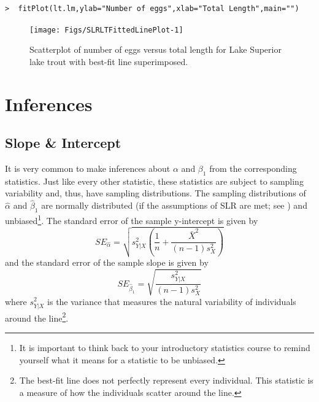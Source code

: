 \documentclass[10pt,openany]{book}\usepackage[]{graphicx}\usepackage[]{color}
\makeatletter
\newenvironment{kframe}{%
 \def\at@end@of@kframe{}%
 \ifinner\ifhmode%
  \def\at@end@of@kframe{\end{minipage}}%
  \begin{minipage}{\columnwidth}%
 \fi\fi%
 \def\FrameCommand##1{\hskip\@totalleftmargin \hskip-\fboxsep
 \colorbox{shadecolor}{##1}\hskip-\fboxsep
     \hskip-\linewidth \hskip-\@totalleftmargin \hskip\columnwidth}%
 \MakeFramed {\advance\hsize-\width
   \@totalleftmargin\z@ \linewidth\hsize
   \@setminipage}}%
 {\par\unskip\endMakeFramed%
 \at@end@of@kframe}
\newenvironment{knitrout}{}{} %
\makeatother
\begin{document}
\begin{knitrout}
\color{fgcolor}\begin{kframe}
\begin{verbatim}
>  fitPlot(lt.lm,ylab="Number of eggs",xlab="Total Length",main="")
\end{verbatim}
\end{kframe}\begin{figure}[h]

{\centering \texttt{[image: Figs/SLRLTFittedLinePlot-1]} 

}

\caption[Scatterplot of number of eggs versus total length for Lake Superior lake trout with best-fit line superimposed]{Scatterplot of number of eggs versus total length for Lake Superior lake trout with best-fit line superimposed.}\label{fig:SLRLTFittedLinePlot}
\end{figure}


\end{knitrout}


\section{Inferences} \label{sect:SLRInferences}
\subsection{Slope \& Intercept}
It is very common to make inferences about $\alpha$ and $\beta_{1}$ from the corresponding statistics.  Just like every other statistic, these statistics are subject to sampling variability and, thus, have sampling distributions.  The sampling distributions of $\hat{\alpha}$ and $\hat{\beta}_{1}$ are normally distributed (if the assumptions of SLR are met; see ) and unbiased\footnote{It is important to think back to your introductory statistics course to remind yourself what it means for a statistic to be unbiased.}.  The standard error of the sample y-intercept is given by
\[ SE_{\hat{\alpha}} = \sqrt{s^{2}_{Y|X}\left(\frac{1}{n}+\frac{\bar{X}^{2}}{(n-1)s_{X}^{2}}\right)} \]
and the standard error of the sample slope is given by
\[ SE_{\hat{\beta}_{1}} = \sqrt{\frac{s^{2}_{Y|X}}{(n-1)s_{X}^{2}}}  \]
where $s^{2}_{Y|X}$ is the variance that measures the natural variability of individuals around the line\footnote{The best-fit line does not perfectly represent every individual.  This statistic is a measure of how the individuals scatter around the line.}.
\end{document}
